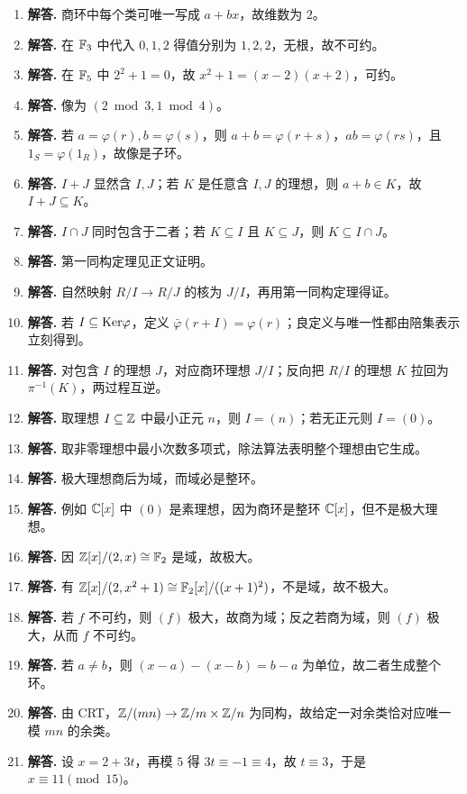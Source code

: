 \begin{enumerate}[label=\textbf{\arabic*.}, leftmargin=*, itemsep=1em]
\item \textbf{解答.} 商环中每个类可唯一写成 $a+bx$，故维数为 $2$。
\item \textbf{解答.} 在 $\mathbb{F}_3$ 中代入 $0,1,2$ 得值分别为 $1,2,2$，无根，故不可约。
\item \textbf{解答.} 在 $\mathbb{F}_5$ 中 $2^2+1=0$，故 $x^2+1=(x-2)(x+2)$，可约。
\item \textbf{解答.} 像为 $(2\bmod3,1\bmod4)$。
\item \textbf{解答.} 若 $a=\varphi(r),b=\varphi(s)$，则 $a+b=\varphi(r+s)$，$ab=\varphi(rs)$，且 $1_S=\varphi(1_R)$，故像是子环。
\item \textbf{解答.} $I+J$ 显然含 $I,J$；若 $K$ 是任意含 $I,J$ 的理想，则 $a+b\in K$，故 $I+J\subseteq K$。
\item \textbf{解答.} $I\cap J$ 同时包含于二者；若 $K\subseteq I$ 且 $K\subseteq J$，则 $K\subseteq I\cap J$。
\item \textbf{解答.} 第一同构定理见正文证明。
\item \textbf{解答.} 自然映射 $R/I\to R/J$ 的核为 $J/I$，再用第一同构定理得证。
\item \textbf{解答.} 若 $I\subseteq\mathrm{Ker}\varphi$，定义 $\bar\varphi(r+I)=\varphi(r)$；良定义与唯一性都由陪集表示立刻得到。
\item \textbf{解答.} 对包含 $I$ 的理想 $J$，对应商环理想 $J/I$；反向把 $R/I$ 的理想 $K$ 拉回为 $\pi^{-1}(K)$，两过程互逆。
\item \textbf{解答.} 取理想 $I\subseteq\mathbb{Z}$ 中最小正元 $n$，则 $I=(n)$；若无正元则 $I=(0)$。
\item \textbf{解答.} 取非零理想中最小次数多项式，除法算法表明整个理想由它生成。
\item \textbf{解答.} 极大理想商后为域，而域必是整环。
\item \textbf{解答.} 例如 $\mathbb{C}[x]$ 中 $(0)$ 是素理想，因为商环是整环 $\mathbb{C}[x]$，但不是极大理想。
\item \textbf{解答.} 因 $\mathbb{Z}[x]/(2,x)\cong \mathbb{F}_2$ 是域，故极大。
\item \textbf{解答.} 有 $\mathbb{Z}[x]/(2,x^2+1)\cong \mathbb{F}_2[x]/((x+1)^2)$，不是域，故不极大。
\item \textbf{解答.} 若 $f$ 不可约，则 $(f)$ 极大，故商为域；反之若商为域，则 $(f)$ 极大，从而 $f$ 不可约。
\item \textbf{解答.} 若 $a\ne b$，则 $(x-a)-(x-b)=b-a$ 为单位，故二者生成整个环。
\item \textbf{解答.} 由 CRT，$\mathbb{Z}/(mn)\to \mathbb{Z}/m\times \mathbb{Z}/n$ 为同构，故给定一对余类恰对应唯一模 $mn$ 的余类。
\item \textbf{解答.} 设 $x=2+3t$，再模 $5$ 得 $3t\equiv -1\equiv4$，故 $t\equiv3$，于是 $x\equiv11\pmod{15}$。

\end{enumerate}
